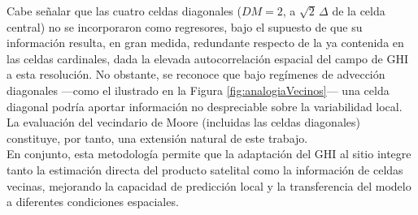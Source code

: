 Cabe señalar que las cuatro celdas diagonales ($DM=2$, a $\sqrt{2}\,\Delta$ de la celda central) no se incorporaron como regresores, bajo el supuesto de que su información resulta, en gran medida, redundante respecto de la ya contenida en las celdas cardinales, dada la elevada autocorrelación espacial del campo de GHI a esta resolución. No obstante, se reconoce que bajo regímenes de advección diagonales —como el ilustrado en la Figura \ref{fig:analogiaVecinos}— una celda diagonal podría aportar información no despreciable sobre la variabilidad local. La evaluación del vecindario de Moore (incluidas las celdas diagonales) constituye, por tanto, una extensión natural de este trabajo.\\

En conjunto, esta metodología permite que la adaptación del GHI al sitio integre tanto la estimación directa del producto satelital como la información de celdas vecinas, mejorando la capacidad de predicción local y la transferencia del modelo a diferentes condiciones espaciales.\\




